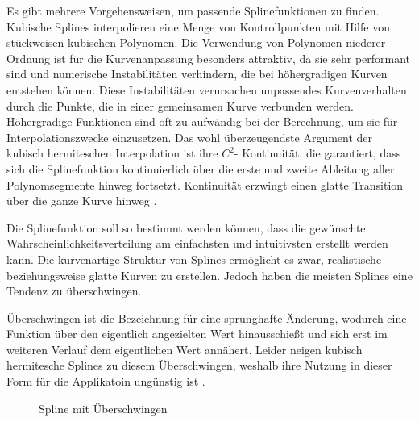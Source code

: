 Es gibt mehrere Vorgehensweisen, um passende Splinefunktionen zu finden. 
Kubische Splines interpolieren eine Menge von Kontrollpunkten mit Hilfe von
stückweisen kubischen Polynomen. Die Verwendung von Polynomen niederer Ordnung ist für die Kurvenanpassung besonders attraktiv, da sie sehr performant sind und numerische Instabilitäten verhindern, die bei höhergradigen Kurven entstehen können. Diese Instabilitäten verursachen unpassendes Kurvenverhalten durch die Punkte, die in einer gemeinsamen Kurve verbunden werden. Höhergradige Funktionen sind oft zu aufwändig bei der Berechnung, um sie für Interpolationszwecke einzusetzen. Das wohl überzeugendste
Argument der kubisch hermiteschen Interpolation ist ihre $C^2$-
Kontinuität, die garantiert, dass sich die Splinefunktion kontinuierlich über die erste und zweite Ableitung aller Polynomsegmente hinweg fortsetzt.
Kontinuität erzwingt einen glatte Transition über die ganze Kurve hinweg \cite{Wolberg1999}.

Die Splinefunktion soll so bestimmt werden können, dass die gewünschte Wahrscheinlichkeitsverteilung am einfachsten und intuitivsten erstellt werden kann. Die kurvenartige Struktur von Splines ermöglicht es zwar, realistische beziehungsweise glatte Kurven zu erstellen. Jedoch haben die meisten Splines eine Tendenz zu überschwingen. 

Überschwingen ist die Bezeichnung für eine sprunghafte Änderung, wodurch eine Funktion über den eigentlich angezielten Wert hinausschießt und sich erst im weiteren Verlauf dem eigentlichen Wert annähert. Leider neigen kubisch hermitesche Splines zu diesem Überschwingen, weshalb ihre Nutzung in dieser Form für die Applikatoin ungünstig ist \cite{kruger:2007}.

\begin{figure}[H]
    \center
    \caption{Spline mit Überschwingen}\label{fig:spline}
\end{figure}

